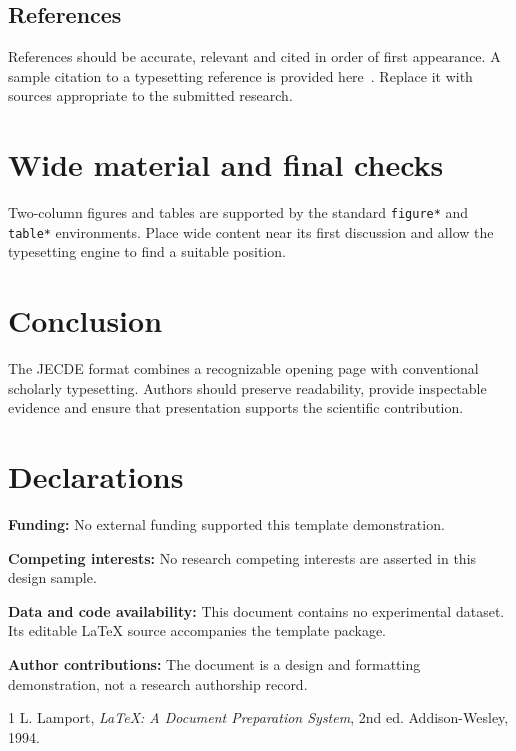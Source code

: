 \documentclass{jecde}
\begin{document}
\subsection{References}
References should be accurate, relevant and cited in order of first appearance. A sample citation to a typesetting reference is provided here~\cite{lamport}. Replace it with sources appropriate to the submitted research.

\section{Wide material and final checks}
Two-column figures and tables are supported by the standard \texttt{figure*} and \texttt{table*} environments. Place wide content near its first discussion and allow the typesetting engine to find a suitable position.





\section{Conclusion}
The JECDE format combines a recognizable opening page with conventional scholarly typesetting. Authors should preserve readability, provide inspectable evidence and ensure that presentation supports the scientific contribution.

\section*{Declarations}
\textbf{Funding:} No external funding supported this template demonstration.

\textbf{Competing interests:} No research competing interests are asserted in this design sample.

\textbf{Data and code availability:} This document contains no experimental dataset. Its editable LaTeX source accompanies the template package.

\textbf{Author contributions:} The document is a design and formatting demonstration, not a research authorship record.

\begin{thebibliography}{1}
 L. Lamport, \emph{LaTeX: A Document Preparation System}, 2nd ed. Addison-Wesley, 1994.
\end{thebibliography}
\end{document}
